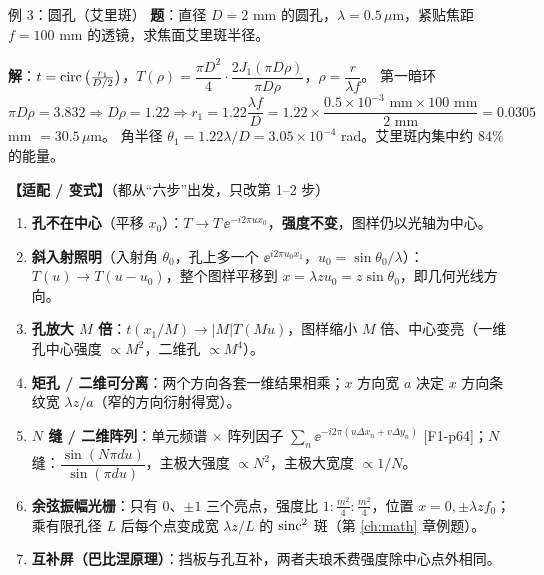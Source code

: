 \begin{center}
\end{center}

\begin{exam}{例 3：圆孔（艾里斑）}
\textbf{题}：直径 $D=2$ mm 的圆孔，$\lambda=0.5\,\mu$m，紧贴焦距 $f=100$ mm 的透镜，求焦面艾里斑半径。

\textbf{解}：$t=\operatorname{circ}\big(\frac{r_1}{D/2}\big)$，$T(\rho)=\dfrac{\pi D^2}{4}\cdot\dfrac{2J_1(\pi D\rho)}{\pi D\rho}$，$\rho=\dfrac{r}{\lambda f}$。
第一暗环 $\pi D\rho=3.832\Rightarrow D\rho=1.22\Rightarrow r_1=1.22\dfrac{\lambda f}{D}=1.22\times\dfrac{0.5\times10^{-3}\text{ mm}\times100\text{ mm}}{2\text{ mm}}=0.0305$ mm $=30.5\,\mu$m。
角半径 $\theta_1=1.22\lambda/D=3.05\times10^{-4}$ rad。艾里斑内集中约 84\% 的能量。
\end{exam}

\noindent\textbf{【适配 / 变式】}（都从“六步”出发，只改第 1–2 步）
\begin{enumerate}
\item \textbf{孔不在中心}（平移 $x_0$）：$T\to T\,\ee^{-i2\pi ux_0}$，\textbf{强度不变}，图样仍以光轴为中心。
\item \textbf{斜入射照明}（入射角 $\theta_0$，孔上多一个 $\ee^{i2\pi u_0x_1}$，$u_0=\sin\theta_0/\lambda$）：$T(u)\to T(u-u_0)$，整个图样平移到 $x=\lambda zu_0=z\sin\theta_0$，即几何光线方向。
\item \textbf{孔放大 $M$ 倍}：$t(x_1/M)\to|M|T(Mu)$，图样缩小 $M$ 倍、中心变亮（一维孔中心强度 $\propto M^2$，二维孔 $\propto M^4$）。
\item \textbf{矩孔 / 二维可分离}：两个方向各套一维结果相乘；$x$ 方向宽 $a$ 决定 $x$ 方向条纹宽 $\lambda z/a$（窄的方向衍射得宽）。
\item \textbf{$N$ 缝 / 二维阵列}：单元频谱 $\times$ 阵列因子 $\sum_n\ee^{-i2\pi(u\Delta x_n+v\Delta y_n)}$ [F1-p64]；$N$ 缝：$\dfrac{\sin(N\pi du)}{\sin(\pi du)}$，主极大强度 $\propto N^2$，主极大宽度 $\propto1/N$。
\item \textbf{余弦振幅光栅}：只有 0、$\pm1$ 三个亮点，强度比 $1:\frac{m^2}{4}:\frac{m^2}{4}$，位置 $x=0,\pm\lambda zf_0$；乘有限孔径 $L$ 后每个点变成宽 $\lambda z/L$ 的 $\operatorname{sinc}^2$ 斑（第 \ref{ch:math} 章例题）。
\item \textbf{互补屏（巴比涅原理）}：挡板与孔互补，两者夫琅禾费强度除中心点外相同。
\end{enumerate}

